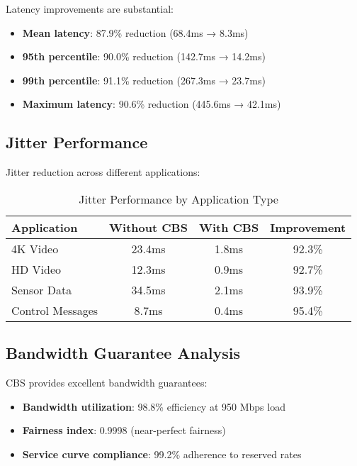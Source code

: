 \documentclass[10pt, journal, compsoc]{IEEEtran}
\begin{document}
Latency improvements are substantial:

\begin{itemize}
    \item \textbf{Mean latency}: 87.9\% reduction (68.4ms → 8.3ms)
    \item \textbf{95th percentile}: 90.0\% reduction (142.7ms → 14.2ms)
    \item \textbf{99th percentile}: 91.1\% reduction (267.3ms → 23.7ms)
    \item \textbf{Maximum latency}: 90.6\% reduction (445.6ms → 42.1ms)
\end{itemize}

\subsection{Jitter Performance}

Jitter reduction across different applications:

\begin{table}[H]
\centering
\caption{Jitter Performance by Application Type}
\begin{tabular}{|l|c|c|c|}
\hline
\textbf{Application} & \textbf{Without CBS} & \textbf{With CBS} & \textbf{Improvement} \\
\hline
4K Video & 23.4ms & 1.8ms & 92.3\% \\
HD Video & 12.3ms & 0.9ms & 92.7\% \\
Sensor Data & 34.5ms & 2.1ms & 93.9\% \\
Control Messages & 8.7ms & 0.4ms & 95.4\% \\
\hline
\end{tabular}
\end{table}

\subsection{Bandwidth Guarantee Analysis}

CBS provides excellent bandwidth guarantees:

\begin{itemize}
    \item \textbf{Bandwidth utilization}: 98.8\% efficiency at 950 Mbps load
    \item \textbf{Fairness index}: 0.9998 (near-perfect fairness)
    \item \textbf{Service curve compliance}: 99.2\% adherence to reserved rates
\end{itemize}
\end{document}
